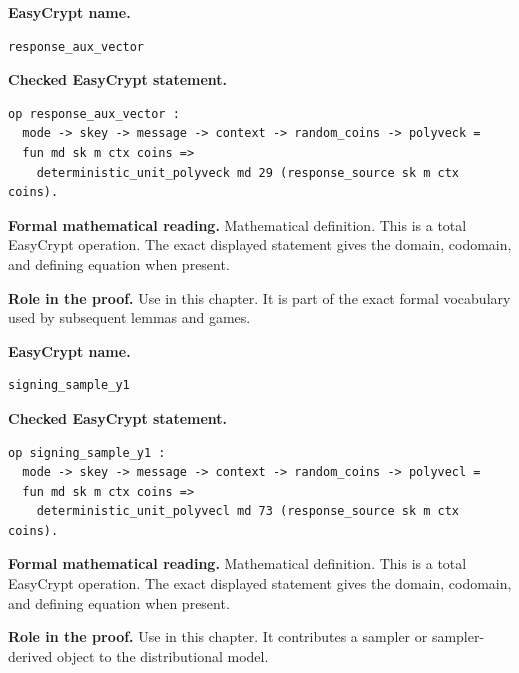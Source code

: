 \begin{formaldefinition}
\noindent\textbf{EasyCrypt name.}
\begin{lstlisting}[language=EasyCrypt,basicstyle=\ttfamily\scriptsize]
response_aux_vector
\end{lstlisting}
\noindent\textbf{Checked EasyCrypt statement.}
\begin{lstlisting}[language=EasyCrypt,basicstyle=\ttfamily\scriptsize]
op response_aux_vector :
  mode -> skey -> message -> context -> random_coins -> polyveck =
  fun md sk m ctx coins =>
    deterministic_unit_polyveck md 29 (response_source sk m ctx coins).
\end{lstlisting}
\noindent\textbf{Formal mathematical reading.}
Mathematical definition. This is a total EasyCrypt operation.  The exact displayed statement gives the domain, codomain, and defining equation when present.

\noindent\textbf{Role in the proof.}
Use in this chapter. It is part of the exact formal vocabulary used by subsequent lemmas and games.

\end{formaldefinition}

\begin{formaldefinition}
\noindent\textbf{EasyCrypt name.}
\begin{lstlisting}[language=EasyCrypt,basicstyle=\ttfamily\scriptsize]
signing_sample_y1
\end{lstlisting}
\noindent\textbf{Checked EasyCrypt statement.}
\begin{lstlisting}[language=EasyCrypt,basicstyle=\ttfamily\scriptsize]
op signing_sample_y1 :
  mode -> skey -> message -> context -> random_coins -> polyvecl =
  fun md sk m ctx coins =>
    deterministic_unit_polyvecl md 73 (response_source sk m ctx coins).
\end{lstlisting}
\noindent\textbf{Formal mathematical reading.}
Mathematical definition. This is a total EasyCrypt operation.  The exact displayed statement gives the domain, codomain, and defining equation when present.

\noindent\textbf{Role in the proof.}
Use in this chapter. It contributes a sampler or sampler-derived object to the distributional model.

\end{formaldefinition}

